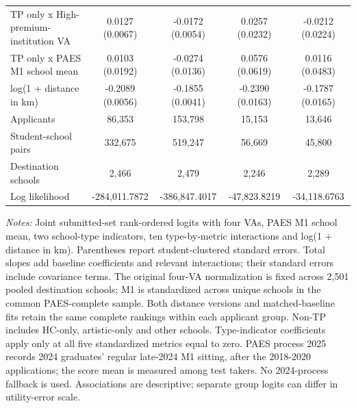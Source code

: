 \begin{table}[!htbp]
{\begin{tabular}{lcccc}
TP only x High-premium-institution VA & 0.0127 (0.0067) & -0.0172 (0.0054) & 0.0257 (0.0232) & -0.0212 (0.0224) \\
TP only x PAES M1 school mean & 0.0103 (0.0192) & -0.0274 (0.0136) & 0.0576 (0.0619) & 0.0116 (0.0483) \\
log(1 + distance in km) & -0.2089 (0.0056) & -0.1855 (0.0041) & -0.2390 (0.0163) & -0.1787 (0.0165) \\
\midrule
Applicants & 86,353 & 153,798 & 15,153 & 13,646 \\
Student-school pairs & 332,675 & 519,247 & 56,669 & 45,800 \\
Destination schools & 2,466 & 2,479 & 2,246 & 2,289 \\
Log likelihood & -284,011.7872 & -386,847.4017 & -47,823.8219 & -34,118.6763 \\
\bottomrule
\end{tabular}
}
\par\smallskip
\begin{minipage}{0.98\linewidth}\footnotesize
\textit{Notes:} Joint submitted-set rank-ordered logits with four VAs, PAES M1 school mean, two school-type indicators, ten type-by-metric interactions and log(1 + distance in km). Parentheses report student-clustered standard errors. Total slopes add baseline coefficients and relevant interactions; their standard errors include covariance terms. The original four-VA normalization is fixed across 2,501 pooled destination schools; M1 is standardized across unique schools in the common PAES-complete sample. Both distance versions and matched-baseline fits retain the same complete rankings within each applicant group. Non-TP includes HC-only, artistic-only and other schools. Type-indicator coefficients apply only at all five standardized metrics equal to zero. PAES process 2025 records 2024 graduates' regular late-2024 M1 sitting, after the 2018-2020 applications; the score mean is measured among test takers. No 2024-process fallback is used. Associations are descriptive; separate group logits can differ in utility-error scale.
\end{minipage}
\end{table}
